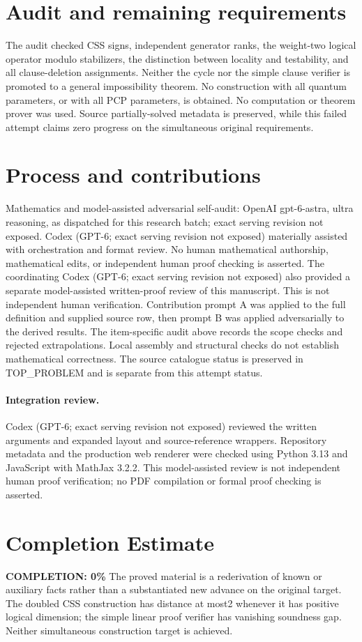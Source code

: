 \documentclass[11pt]{article}
\begin{document}
\section{Audit and remaining requirements}
The audit checked CSS signs, independent generator ranks, the
weight-two logical operator modulo stabilizers, the distinction
between locality and testability, and all clause-deletion
assignments. Neither the cycle nor the simple clause verifier
is promoted to a general impossibility theorem. No construction
with all quantum parameters, or with all PCP parameters, is
obtained. No computation or theorem prover was used. Source
partially-solved metadata is preserved, while this failed attempt
claims zero progress on the simultaneous original requirements.

\section{Process and contributions}
Mathematics and model-assisted adversarial self-audit: OpenAI gpt-6-astra, ultra reasoning, as dispatched for this research batch; exact serving revision not exposed. Codex (GPT-6; exact serving revision not exposed) materially assisted with orchestration and format review. No human mathematical authorship, mathematical edits, or independent human proof checking is asserted.
The coordinating Codex (GPT-6; exact serving revision not exposed) also provided a separate model-assisted written-proof review of this manuscript. This is not independent human verification.
Contribution prompt A was applied to the full definition and supplied source row, then prompt B was applied adversarially to the derived results. The item-specific audit above records the scope checks and rejected extrapolations. Local assembly and structural checks do not establish mathematical correctness. The source catalogue status is preserved in TOP\_PROBLEM and is separate from this attempt status.
\paragraph{Integration review.} Codex (GPT-6; exact serving revision not exposed) reviewed the written arguments and expanded layout and source-reference wrappers. Repository metadata and the production web renderer were checked using Python 3.13 and JavaScript with MathJax 3.2.2. This model-assisted review is not independent human proof verification; no PDF compilation or formal proof checking is asserted.

\section{Completion Estimate}
\noindent\textbf{COMPLETION: 0\%}
The proved material is a rederivation of known or auxiliary facts rather than a substantiated new advance on the original target. The doubled CSS construction has distance at most2 whenever it has positive logical dimension; the simple linear proof verifier has vanishing soundness gap. Neither simultaneous construction target is achieved.
\end{document}
